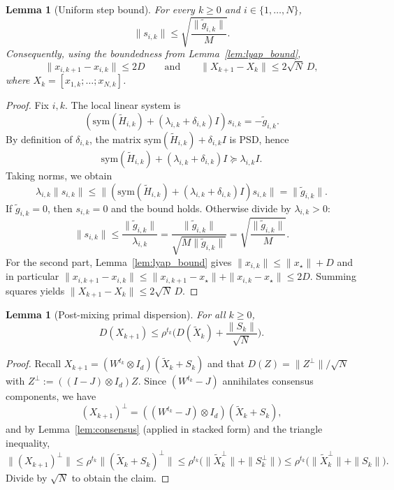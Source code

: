 \documentclass[11pt,a4paper]{article}
\def\one{1}%
\def\J{J}%
\newtheorem{lemma}[theorem]{Lemma}
\newcommand{\one}{\mathbf{1}}
\newcommand{\J}{\left(\frac{1}{N}\one\one^\top\right)}
\begin{document}
\begin{lemma}[Uniform step bound]\label{lem:step_bound_app}
For every $k\ge0$ and $i\in\{1,\dots,N\}$,
\[
\|s_{i,k}\|\le \sqrt{\frac{\|\tilde g_{i,k}\|}{M}}.
\]
Consequently, using the boundedness from Lemma~\ref{lem:lyap_bound},
\[
\|x_{i,k+1}-x_{i,k}\|\le 2D
\qquad\text{and}\qquad
\|X_{k+1}-X_k\|\le 2\sqrt N\,D,
\]
where $X_k=[x_{1,k};\dots;x_{N,k}]$.
\end{lemma}
\begin{proof}
Fix $i,k$. The local linear system is
\[
(\mathrm{sym}(\tilde H_{i,k})+(\lambda_{i,k}+\delta_{i,k})I)s_{i,k}=-\tilde g_{i,k}.
\]
By definition of $\delta_{i,k}$, the matrix $\mathrm{sym}(\tilde H_{i,k})+\delta_{i,k}I$ is PSD, hence
\[
\mathrm{sym}(\tilde H_{i,k})+(\lambda_{i,k}+\delta_{i,k})I \succeq \lambda_{i,k}I.
\]
Taking norms, we obtain
\[
\lambda_{i,k}\|s_{i,k}\|\le \|(\mathrm{sym}(\tilde H_{i,k})+(\lambda_{i,k}+\delta_{i,k})I)s_{i,k}\|=\|\tilde g_{i,k}\|.
\]
If $\tilde g_{i,k}=0$, then $s_{i,k}=0$ and the bound holds. Otherwise divide by $\lambda_{i,k}>0$:
\[
\|s_{i,k}\|\le \frac{\|\tilde g_{i,k}\|}{\lambda_{i,k}}
=\frac{\|\tilde g_{i,k}\|}{\sqrt{M\|\tilde g_{i,k}\|}}
=\sqrt{\frac{\|\tilde g_{i,k}\|}{M}}.
\]
For the second part, Lemma~\ref{lem:lyap_bound} gives $\|x_{i,k}\|\le \|x_\star\|+D$ and in particular
$\|x_{i,k+1}-x_{i,k}\|\le \|x_{i,k+1}-x_\star\|+\|x_{i,k}-x_\star\|\le 2D$.
Summing squares yields $\|X_{k+1}-X_k\|\le 2\sqrt N\,D$.
\end{proof}

\begin{lemma}[Post-mixing primal dispersion]\label{lem:DX_post}
For all $k\ge 0$,
\[
D(X_{k+1})\le \rho^{t_k}\Big(D(\tilde X_k)+\frac{\|S_k\|}{\sqrt N}\Big).
\]
\end{lemma}
\begin{proof}
Recall $X_{k+1}=(W^{t_k}\otimes I_d)(\tilde X_k+S_k)$ and that $D(Z)=\|Z^\perp\|/\sqrt N$ with $Z^\perp:=((I-\J)\otimes I_d)Z$.
Since $(W^{t_k}-\J)$ annihilates consensus components, we have
\[
(X_{k+1})^\perp = ((W^{t_k}-\J)\otimes I_d)(\tilde X_k+S_k),
\]
and by Lemma~\ref{lem:consensus} (applied in stacked form) and the triangle inequality,
\[
\| (X_{k+1})^\perp\|
\le \rho^{t_k}\|(\tilde X_k+S_k)^\perp\|
\le \rho^{t_k}\big(\|\tilde X_k^\perp\|+\|S_k^\perp\|\big)
\le \rho^{t_k}\big(\|\tilde X_k^\perp\|+\|S_k\|\big).
\]
Divide by $\sqrt N$ to obtain the claim.
\end{proof}
\end{document}
